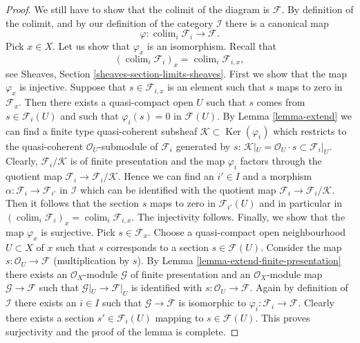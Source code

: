 \documentclass{stacks-project}
\theoremstyle{plain}
\theoremstyle{definition}
\theoremstyle{remark}
\numberwithin{equation}{subsection}
\def\colim{\mathop{\mathrm{colim}}\nolimits}
\def\Ker{\mathop{\mathrm{Ker}}}
\begin{document}
\begin{proof}
\medskip\noindent
We still have to show that the colimit of the diagram is $\mathcal{F}$.
By definition of the colimit, and by our definition of the category
$\mathcal{I}$ there is a canonical map
$$
\varphi :
\colim_i \mathcal{F}_i
\longrightarrow
\mathcal{F}.
$$
Pick $x \in X$. Let us show that $\varphi_x$ is an isomorphism.
Recall that
$$
(\colim_i \mathcal{F}_i)_x
=
\colim_i \mathcal{F}_{i, x},
$$
see
Sheaves, Section \ref{sheaves-section-limits-sheaves}.
First we show that the map $\varphi_x$ is injective.
Suppose that $s \in \mathcal{F}_{i, x}$ is an element
such that $s$ maps to zero in $\mathcal{F}_x$. Then there exists
a quasi-compact open $U$ such that $s$ comes from $s \in \mathcal{F}_i(U)$
and such that $\varphi_i(s) = 0$ in $\mathcal{F}(U)$.
By Lemma \ref{lemma-extend}
we can find a finite type quasi-coherent subsheaf
$\mathcal{K} \subset \Ker(\varphi_i)$ which restricts to
the quasi-coherent $\mathcal{O}_U$-submodule of $\mathcal{F}_i$
generated by $s$:
$\mathcal{K}|_U = \mathcal{O}_U\cdot s \subset \mathcal{F}_i|_U$.
Clearly, $\mathcal{F}_i/\mathcal{K}$ is of finite presentation and
the map $\varphi_i$ factors through the quotient map
$\mathcal{F}_i \to \mathcal{F}_i/\mathcal{K}$. Hence we can find
an $i' \in I$ and a morphism $\alpha : \mathcal{F}_i \to \mathcal{F}_{i'}$
in $\mathcal{I}$ which can be identified with the quotient map
$\mathcal{F}_i \to \mathcal{F}_i/\mathcal{K}$. Then it follows
that the section $s$ maps to zero in $\mathcal{F}_{i'}(U)$ and
in particular in
$(\colim_i \mathcal{F}_i)_x =
\colim_i \mathcal{F}_{i, x}$.
The injectivity follows.
Finally, we show that the map $\varphi_x$ is surjective.
Pick $s \in \mathcal{F}_x$. Choose a quasi-compact open neighbourhood
$U \subset X$ of $x$ such that $s$ corresponds to a section
$s \in \mathcal{F}(U)$. Consider the map
$s : \mathcal{O}_U \to \mathcal{F}$ (multiplication by $s$).
By Lemma \ref{lemma-extend-finite-presentation}
there exists an $\mathcal{O}_X$-module $\mathcal{G}$
of finite presentation and an $\mathcal{O}_X$-module map
$\mathcal{G} \to \mathcal{F}$ such that $\mathcal{G}|_U \to \mathcal{F}|_U$
is identified with
$s : \mathcal{O}_U \to \mathcal{F}$.
Again by definition of $\mathcal{I}$ there exists an $i \in I$
such that $\mathcal{G} \to \mathcal{F}$ is isomorphic to
$\varphi_i : \mathcal{F}_i \to \mathcal{F}$. Clearly there exists
a section $s' \in \mathcal{F}_i(U)$ mapping to $s \in \mathcal{F}(U)$.
This proves surjectivity and the proof of the lemma is complete.
\end{proof}
\end{document}
